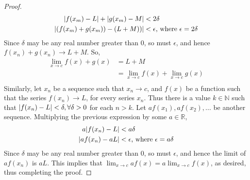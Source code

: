 \documentclass{article}
\DeclarePairedDelimiter\abs{\lvert}{\rvert}%
\theoremstyle{remark}
\begin{document}
\begin{proof}
\[
\begin{aligned}
    \abs{f(x_m)-L} + \abs{g(x_m)-M} &< 2\delta \\
    \abs{(f(x_m)+g(x_m))-(L+M))} &< \epsilon \text{, where } \epsilon = 2\delta \\
\end{aligned}
\]
Since $\delta$ may be any real number greater than 0, so must $\epsilon$, and hence
$f(x_n)+g(x_n) \rightarrow L+M$. So,
\[
\begin{aligned}
    \lim_{x \to c} f(x) + g(x) &= L+M \\
    &= \lim_{x \to c} f(x) + \lim_{x \to c} g(x) \\
\end{aligned}
\]
Similarly, let $x_n$ be a sequence such that $x_n \rightarrow c$, and
$f(x)$ be a function such that the series $f(x_n) \rightarrow L$,
for every series $x_n$. Thus there is a value $k \in \mathbb{N}$
such that $\abs{f(x_n)-L} < \delta, \forall \delta > 0$ for each
$n > k$.
Let $af(x_1), af(x_2), ...$ be another sequence. Multiplying the
previous expression by some $a \in \mathbb{R}$,
\[
\begin{aligned}
    a\abs{f(x_n)-L} &< a\delta \\
    \abs{af(x_n)-aL} &< \epsilon \text{, where } \epsilon = a\delta \\
\end{aligned}
\]
Since $\delta$ may be any real number greater than 0, so must $\epsilon$,
and hence the limit of $af(x_n)$ is $aL$. This implies that
$\lim_{x \to c} af(x) = a\lim_{x \to c} f(x)$, as desired,
thus completing the proof.

\end{proof}
\end{document}
